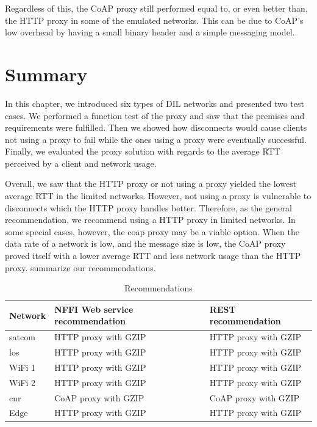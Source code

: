Regardless of this, the CoAP proxy still performed equal to, or even better
than, the HTTP proxy in some of the emulated networks. This can be due to CoAP's
low overhead by having a small binary header and a simple messaging model.


\section{Summary}

In this chapter, we introduced six types of DIL networks and presented two test
cases. We performed a function test of the proxy and saw that the premises and
requirements were fulfilled. Then we showed how disconnects would cause clients
not using a proxy to fail while the ones using a proxy were eventually
successful. Finally, we evaluated the proxy solution with regards to the average
RTT perceived by a client and network usage.

 Overall, we saw that the HTTP proxy or not using a proxy yielded the lowest
 average RTT in the limited networks. However, not using a proxy is vulnerable
 to disconnects which the HTTP proxy handles better. Therefore, as the general
 recommendation, we recommend using a HTTP proxy in limited networks. In some
 special cases, however, the \gls{coap} proxy may be a viable option. When the
 data rate of a network is low, and the message size is low, the CoAP proxy
 proved itself with a lower average RTT and less network usage than the HTTP
 proxy.  summarize our recommendations.

\begin{table}[h]
\begin{tabular}{| l | l | l |}
\hline
  \textbf{Network} & \textbf{NFFI Web service recommendation} & \textbf{REST recommendation}\\ \hline
  \gls{satcom} & HTTP proxy with GZIP & HTTP proxy with GZIP \\ \hline
  \gls{los} & HTTP proxy with GZIP  & HTTP proxy with GZIP \\ \hline
  WiFi 1 & HTTP proxy with GZIP & HTTP proxy with GZIP \\ \hline
  WiFi 2 & HTTP proxy with GZIP & HTTP proxy with GZIP \\ \hline
  \gls{cnr} & CoAP proxy with GZIP & CoAP proxy with GZIP \\ \hline
  Edge & HTTP proxy with GZIP & HTTP proxy with GZIP \\ \hline
\end{tabular}
\caption{Recommendations}
\label{table-evaluation-summary}
\end{table}
